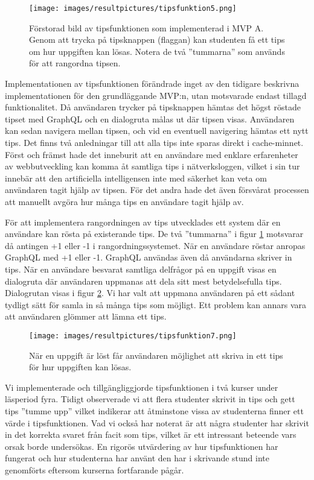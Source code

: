 \begin{figure}[hbtp]
    \centering
    \texttt{[image: images/resultpictures/tipsfunktion5.png]}
    \caption{Förstorad bild av tipsfunktionen som implementerad i MVP A. Genom att trycka på tipsknappen (flaggan) kan studenten få ett tips om hur uppgiften kan lösas. Notera de två ''tummarna'' som används för att rangordna tipsen.}
    \label{fig:raket6}
\end{figure}


Implementationen av tipsfunktionen förändrade inget av den tidigare beskrivna implementationen för den grundläggande MVP:n, utan motsvarade endast tillagd funktionalitet. Då användaren trycker på tipsknappen hämtas det högst röstade tipset med GraphQL och en dialogruta målas ut där tipsen visas. Användaren kan sedan navigera mellan tipsen, och vid en eventuell navigering hämtas ett nytt tips. Det finns två anledningar till att alla tips inte sparas direkt i cache-minnet. Först och främst hade det inneburit att en användare med enklare erfarenheter av webbutveckling kan komma åt samtliga tips i nätverksloggen, vilket i sin tur innebär att den artificiella intelligensen inte med säkerhet kan veta om användaren tagit hjälp av tipsen. För det andra hade det även försvårat processen att manuellt avgöra hur många tips en användare tagit hjälp av.

För att implementera rangordningen av tips utvecklades ett system där en användare kan rösta på existerande tips. De två ''tummarna'' i figur \ref{fig:raket6} motsvarar då antingen +1 eller -1 i rangordningssystemet. När en användare röstar anropas GraphQL med +1 eller -1. GraphQL användas även då användarna skriver in tips. När en användare besvarat samtliga delfrågor på en uppgift visas en dialogruta där användaren uppmanas att dela sitt mest betydelsefulla tips. Dialogrutan visas i figur \ref{fig:raket7}. Vi har valt att uppmana användaren på ett sådant tydligt sätt för samla in så många tips som möjligt. Ett problem kan annars vara att användaren glömmer att lämna ett tips.

\begin{figure}[hbtp]
    \centering
    \texttt{[image: images/resultpictures/tipsfunktion7.png]}
    \caption{När en uppgift är löst får användaren möjlighet att skriva in ett tips för hur uppgiften kan lösas.}
    \label{fig:raket7}
\end{figure}


Vi implementerade och tillgängliggjorde tipsfunktionen i två kurser under läsperiod fyra. Tidigt observerade vi att flera studenter skrivit in tips och gett tips ”tumme upp” vilket indikerar att åtminstone vissa av studenterna finner ett värde i tipsfunktionen. Vad vi också har noterat är att några studenter har skrivit in det korrekta svaret från facit som tips, vilket är ett intressant beteende vars orsak borde undersökas. En rigorös utvärdering av hur tipsfunktionen har fungerat och hur studenterna har använt den har i skrivande stund inte genomförts eftersom kurserna fortfarande pågår.

